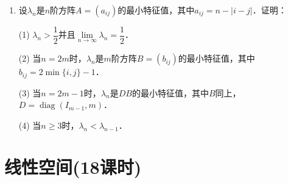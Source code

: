 \documentclass[a4paper,fontset=windows]{ctexbook}
\theoremstyle{definition}
\DeclareMathOperator{\diag}{diag}
\renewcommand{\le}{\leqslant}
\renewcommand{\ge}{\geqslant}
\begin{document}
\begin{enumerate}
\item 设$\lambda_n$是$n$阶方阵$A=(a_{ij})$的最小特征值，其中$a_{ij}=n-|i-j|$．证明：

(1) $\lambda_n>\dfrac{1}{2}$并且$\lim\limits_{n\to\infty}\lambda_n=\dfrac{1}{2}$．

(2) 当$n=2m$时，$\lambda_n$是$m$阶方阵$B=(b_{ij})$的最小特征值，其中$b_{ij}=2\min\{i,j\}-1$．

(3) 当$n=2m-1$时，$\lambda_n$是$DB$的最小特征值，其中$B$同上，$D=\diag(I_{m-1},m)$．

(4) 当$n\ge 3$时，$\lambda_n<\lambda_{n-1}$．

\end{enumerate}

\chapter{线性空间(18课时)}%
\end{document}
